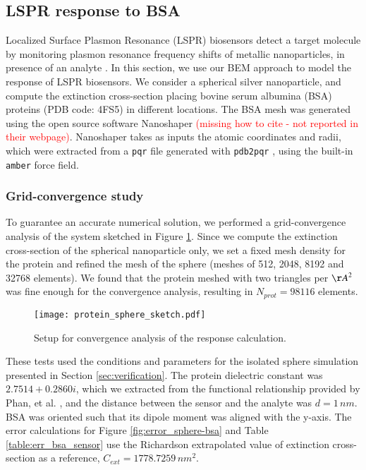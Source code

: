 \subsection{LSPR response to BSA} \label{sec:lspr_response}

Localized Surface Plasmon Resonance (LSPR) biosensors detect a target molecule by monitoring
plasmon resonance frequency shifts of metallic nanoparticles, in presence of an analyte \cite{WilletsVandyune2007}.
In this section, we use our BEM approach to model the response of LSPR biosensors.
We consider a spherical silver nanoparticle, and compute the extinction cross-section placing 
bovine serum albumina (BSA) proteins (PDB code: 4FS5) in different locations.
The BSA mesh was generated using the open source software Nanoshaper 
\textcolor{red}{(missing how to cite - not reported in their webpage)}. 
Nanoshaper takes as inputs the atomic coordinates and radii, 
which were extracted from a \texttt{pqr} file generated with 
\texttt{pdb2pqr} \cite{Dolinsky04}, using the built-in \texttt{amber} force field.

\subsubsection{Grid-convergence study} \label{sec:bsa_convergence}
To guarantee an accurate numerical solution, we performed a grid-convergence 
analysis of the system sketched in Figure \ref{fig:setup_conv}. 
Since we compute the extinction cross-section of the spherical nanoparticle only, we 
set a fixed mesh density for the protein and refined the mesh of the
sphere (meshes of 512, 2048, 8192 and 32768 elements). We found that the protein meshed with two
triangles per ${\AA}^2$ was fine enough for the convergence analysis, resulting in $N_{prot} = 98116$ elements. 


\begin{figure}[h] %
   \centering
   \texttt{[image: protein\_sphere\_sketch.pdf]} 
   \caption{Setup for convergence analysis of the response calculation.}
   \label{fig:setup_conv}
\end{figure}

These tests used the conditions and parameters for the isolated sphere simulation
presented in Section \ref{sec:verification}. The protein dielectric constant was
$2.7514 + 0.2860i$, which we extracted from the 
functional relationship provided by Phan, et al. \cite{PahnETal2013}, and the 
distance between the sensor and the analyte was $d=1 \, nm$. BSA was oriented such that
its dipole moment was aligned with the y-axis. The error calculations for Figure \ref{fig:error_sphere-bsa}
and Table \ref{table:err_bsa_sensor} use the Richardson extrapolated value of extinction cross-section as a
reference, $C_{ext}= 1778.7259 \, nm^2$.


